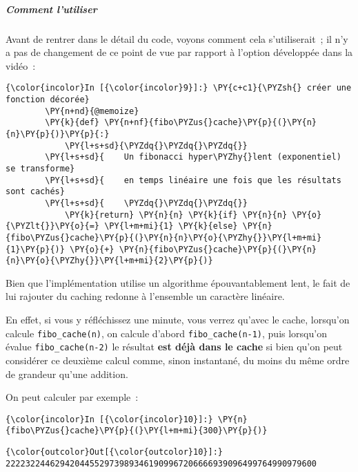     \hypertarget{comment-lutiliser}{%
\subparagraph{Comment l'utiliser}\label{comment-lutiliser}}

    Avant de rentrer dans le détail du code, voyons comment cela
s'utiliserait~; il n'y a pas de changement de ce point de vue par
rapport à l'option développée dans la vidéo~:

    \begin{Verbatim}[commandchars=\\\{\}]
{\color{incolor}In [{\color{incolor}9}]:} \PY{c+c1}{\PYZsh{} créer une fonction décorée}
        \PY{n+nd}{@memoize}
        \PY{k}{def} \PY{n+nf}{fibo\PYZus{}cache}\PY{p}{(}\PY{n}{n}\PY{p}{)}\PY{p}{:}
            \PY{l+s+sd}{\PYZdq{}\PYZdq{}\PYZdq{}}
        \PY{l+s+sd}{    Un fibonacci hyper\PYZhy{}lent (exponentiel) se transforme}
        \PY{l+s+sd}{    en temps linéaire une fois que les résultats sont cachés}
        \PY{l+s+sd}{    \PYZdq{}\PYZdq{}\PYZdq{}}
            \PY{k}{return} \PY{n}{n} \PY{k}{if} \PY{n}{n} \PY{o}{\PYZlt{}}\PY{o}{=} \PY{l+m+mi}{1} \PY{k}{else} \PY{n}{fibo\PYZus{}cache}\PY{p}{(}\PY{n}{n}\PY{o}{\PYZhy{}}\PY{l+m+mi}{1}\PY{p}{)} \PY{o}{+} \PY{n}{fibo\PYZus{}cache}\PY{p}{(}\PY{n}{n}\PY{o}{\PYZhy{}}\PY{l+m+mi}{2}\PY{p}{)}
\end{Verbatim}


    Bien que l'implémentation utilise un algorithme épouvantablement lent,
le fait de lui rajouter du caching redonne à l'ensemble un caractère
linéaire.

En effet, si vous y réfléchissez une minute, vous verrez qu'avec le
cache, lorsqu'on calcule \texttt{fibo\_cache(n)}, on calcule d'abord
\texttt{fibo\_cache(n-1)}, puis lorsqu'on évalue
\texttt{fibo\_cache(n-2)} le résultat \textbf{est déjà dans le cache} si
bien qu'on peut considérer ce deuxième calcul comme, sinon instantané,
du moins du même ordre de grandeur qu'une addition.

On peut calculer par exemple~:

    \begin{Verbatim}[commandchars=\\\{\}]
{\color{incolor}In [{\color{incolor}10}]:} \PY{n}{fibo\PYZus{}cache}\PY{p}{(}\PY{l+m+mi}{300}\PY{p}{)}
\end{Verbatim}


\begin{Verbatim}[commandchars=\\\{\}]
{\color{outcolor}Out[{\color{outcolor}10}]:} 222232244629420445529739893461909967206666939096499764990979600
\end{Verbatim}
            
